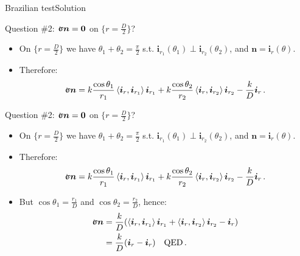 \documentclass{beamer}
\renewcommand{\ij}{i}
\newcommand{\iv}{{\boldsymbol\ij}}
\newcommand{\nj}{n}
\newcommand{\nv}{{\boldsymbol\nj}}
\newcommand*{\stress}{\mbox{$\hspace{0.3em}\rotatebox[x=0pt,y=0.2pt]{90}{\rule{0.017\linewidth}{0.4pt}}\hspace{-0.25em}\upsigma$}}
\newcommand{\bzero}{{\bf 0}}
\newcommand{\scal}[1]{\left\langle{#1}\right\rangle}
\begin{document}
\begin{frame}{Brazilian test}{Solution}

\begin{overprint}

\vskip-20pt
\begin{exampleblock}{Question \#2: $\stress\nv=\bzero$ on $\{r=\frac{D}{2}\}$?}
\begin{itemize}
\item On $\{r=\frac{D}{2}\}$ we have $\theta_1+\theta_2=\frac{\pi}{2}$ s.t. $\iv_{r_1}(\theta_1)\perp\iv_{r_2}(\theta_2)$, and $\nv=\iv_r(\theta)$.
\item Therefore:
\begin{displaymath}
\stress\nv=k\frac{\cos\theta_1}{r_1}\scal{\iv_r,\iv_{r_1}}\iv_{r_1}+k\frac{\cos\theta_2}{r_2}\scal{\iv_r,\iv_{r_2}}\iv_{r_2}-\frac{k}{D}\iv_r\,.
\end{displaymath}
\end{itemize}
\end{exampleblock}

\vskip-20pt
\begin{exampleblock}{Question \#2: $\stress\nv=\bzero$ on $\{r=\frac{D}{2}\}$?}
\begin{itemize}
\item On $\{r=\frac{D}{2}\}$ we have $\theta_1+\theta_2=\frac{\pi}{2}$ s.t. $\iv_{r_1}(\theta_1)\perp\iv_{r_2}(\theta_2)$, and $\nv=\iv_r(\theta)$.
\item Therefore:
\begin{displaymath}
\stress\nv=k\frac{\cos\theta_1}{r_1}\scal{\iv_r,\iv_{r_1}}\iv_{r_1}+k\frac{\cos\theta_2}{r_2}\scal{\iv_r,\iv_{r_2}}\iv_{r_2}-\frac{k}{D}\iv_r\,.
\end{displaymath}
\item But $\cos\theta_1=\frac{r_1}{D}$ and $\cos\theta_2=\frac{r_2}{D}$, hence:
\begin{displaymath}
\begin{split}
\stress\nv &=\frac{k}{D}(\scal{\iv_r,\iv_{r_1}}\iv_{r_1}+\scal{\iv_r,\iv_{r_2}}\iv_{r_2}-\iv_r) \\
&=\frac{k}{D}(\iv_r-\iv_r)\quad\text{QED}\,.
\end{split}
\end{displaymath}
\end{itemize}
\end{exampleblock}

\end{overprint}

\end{frame}
\end{document}
